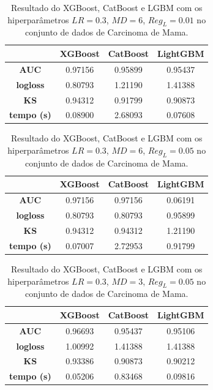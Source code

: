\begin{table}[H]
\label{res:ren:6}
\centering
\begin{tabular}{|c|c|c|c|}
\hline
	& \textbf{XGBoost} &\textbf{CatBoost} & \textbf{LightGBM} \\
\hline
\textbf{AUC}	& 0.97156	&0.95899	&0.95437 \\
\hline
\textbf{logloss}	& 0.80793	&1.21190	&1.41388 \\
\hline
\textbf{KS}	&0.94312	&0.91799	&0.90873 \\
\hline
\textbf{tempo (s)}	&0.08900	&2.68093	&0.07608\\
\hline
\end{tabular}
\caption{Resultado do XGBoost, CatBoost e LGBM com os hiperparâmetros $LR=0.3$, $MD=6$, $Reg_L=0.01$ no conjunto de dados de Carcinoma de Mama.}
\end{table}

\begin{table}[H]
\label{res:ren:7}
\centering
\begin{tabular}{|c|c|c|c|}
\hline
	& \textbf{XGBoost} &\textbf{CatBoost} & \textbf{LightGBM} \\
\hline
\textbf{AUC}	& 0.97156&	0.97156	&0.06191 \\
\hline
\textbf{logloss}	& 0.80793	&0.80793&	0.95899 \\
\hline
\textbf{KS}	&0.94312	&0.94312&	1.21190\\
\hline
\textbf{tempo (s)}	&0.07007&	2.72953	&0.91799\\
\hline
\end{tabular}
\caption{Resultado do XGBoost, CatBoost e LGBM com os hiperparâmetros $LR=0.3$, $MD=6$, $Reg_L=0.05$ no conjunto de dados de Carcinoma de Mama.}
\end{table}

\begin{table}[H]
\label{res:ren:8}
\centering
\begin{tabular}{|c|c|c|c|}
\hline
	& \textbf{XGBoost} &\textbf{CatBoost} & \textbf{LightGBM} \\
\hline
\textbf{AUC}	& 0.96693	&0.95437	&0.95106 \\
\hline
\textbf{logloss}	& 1.00992&	1.41388	&1.41388 \\
\hline
\textbf{KS}	&0.93386	&0.90873	&0.90212 \\
\hline
\textbf{tempo (s)}	&0.05206&	0.83468	&0.09816\\
\hline
\end{tabular}
\caption{Resultado do XGBoost, CatBoost e LGBM com os hiperparâmetros $LR=0.3$, $MD=3$, $Reg_L=0.05$ no conjunto de dados de Carcinoma de Mama.}
\end{table}


